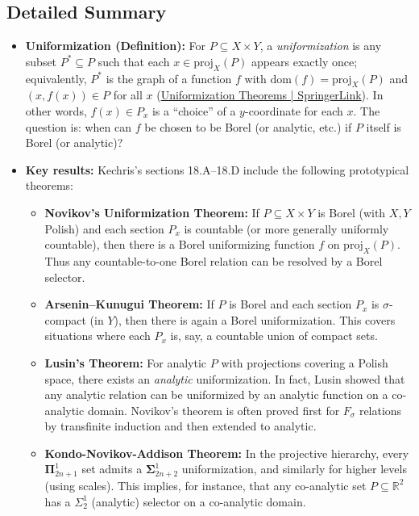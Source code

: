 \documentclass[11pt]{article}
\begin{document}
\subsection{Detailed Summary}
\label{detailed-summary-8}
\begin{itemize}
\item \textbf{Uniformization (Definition):} For \(P\subseteq X\times Y\), a
\emph{uniformization} is any subset \(P^*\subseteq P\) such that each
\(x\in\mathrm{proj}_X(P)\) appears exactly once; equivalently, \(P^*\)
is the graph of a function \(f\) with
\(\mathrm{dom}(f)=\mathrm{proj}_X(P)\) and \((x,f(x))\in P\) for all
\(x\)
(\href{https://link.springer.com/content/pdf/10.1007/978-1-4612-4190-4\_18\#:\~:text=Given\%20two\%20sets\%20X\%2C\%20Y,a\%20uniformizing\%20function\%20for\%20P}{Uniformization
Theorems | SpringerLink}). In other words, \(f(x)\in P_x\) is a
“choice” of a \(y\)-coordinate for each \(x\). The question is: when
can \(f\) be chosen to be Borel (or analytic, etc.) if \(P\) itself is
Borel (or analytic)?

\item \textbf{Key results:} Kechris's sections 18.A--18.D include the following
prototypical theorems:

\begin{itemize}
\item \textbf{Novikov's Uniformization Theorem:} If \(P\subseteq X\times Y\) is
Borel (with \(X,Y\) Polish) and each section \(P_x\) is countable
(or more generally uniformly countable), then there is a Borel
uniformizing function \(f\) on \(\mathrm{proj}_X(P)\). Thus any
countable-to-one Borel relation can be resolved by a Borel selector.
\item \textbf{Arsenin--Kunugui Theorem:} If \(P\) is Borel and each section
\(P_x\) is \(\sigma\)-compact (in \(Y\)), then there is again a
Borel uniformization. This covers situations where each \(P_x\) is,
say, a countable union of compact sets.
\item \textbf{Lusin's Theorem:} For analytic \(P\) with projections covering a
Polish space, there exists an \emph{analytic} uniformization. In fact,
Lusin showed that any analytic relation can be uniformized by an
analytic function on a co-analytic domain. Novikov's theorem is
often proved first for \(F_\sigma\) relations by transfinite
induction and then extended to analytic.
\item \textbf{Kondo-Novikov-Addison Theorem:} In the projective hierarchy, every
\(\mathbf{\Pi}^1_{2n+1}\) set admits a \(\mathbf{\Sigma}^1_{2n+2}\)
uniformization, and similarly for higher levels (using scales). This
implies, for instance, that any co-analytic set
\(P\subseteq\mathbb{R}^2\) has a \(\Sigma^1_2\) (analytic) selector
on a co-analytic domain.
\end{itemize}


\end{itemize}
\end{document}

